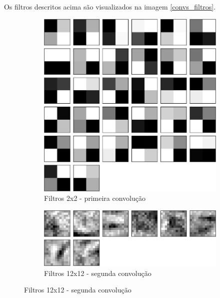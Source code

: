 \documentclass[
	12pt,				%
	oneside,			%
	a4paper,			%
	english,			%
	french,				%
	spanish,			%
	brazil,				%
	]{abntex2}
\begin{document}
\par Os filtros descritos acima são visualizados na imagem \ref{convs_filtros}.

\begin{figure}[h]
	\centering
	
	\begin{subfigure}{.8\textwidth}
		\centering
		\includegraphics[width=.6\linewidth]{images/fabio/resultados/network_3/filter_convolution2d_1}%
		\caption{Filtros 2x2 - primeira convolução}		
		\label{fig:conv1_filtro}	
	\end{subfigure}%
	
	\begin{subfigure}{.8\textwidth}
		\centering
		\includegraphics[width=.6\linewidth]{images/fabio/resultados/network_3/filter_convolution2d_2}
		\caption{Filtros 12x12 - segunda convolução}		
		\label{fig:conv2_filtro}	
	\end{subfigure}%
	

\end{figure}
\end{document}
